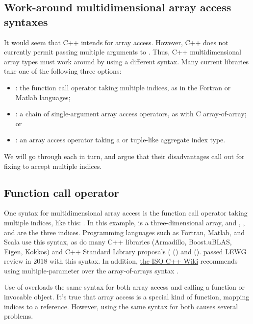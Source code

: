 \documentclass{wg21}
\begin{document}
\subsection{Work-around multidimensional array access syntaxes}

It would seem that C++ intends  for array access.  However, C++ does not currently permit passing multiple arguments to .  Thus, C++ multidimensional array types must work around by using a different syntax.  Many current libraries take one of the following three options:

\begin{itemize}
\item {}: the function call operator taking multiple indices, as in the Fortran or Matlab languages;
\item {}: a chain of single-argument array access operators, as with C array-of-array; or
\item {}: an array access operator taking a  or tuple-like aggregate index type.
\end{itemize}

We will go through each in turn, and argue that their disadvantages call out for fixing  to accept multiple indices.

\subsection{Function call operator}

One syntax for multidimensional array access is the function call operator taking multiple indices, like this: .  In this example,  is a three-dimensional array, and , , and  are the three indices.  Programming languages such as Fortran, Matlab, and Scala use this syntax, as do many C++ libraries (Armadillo, Boost.uBLAS, Eigen, Kokkos) and C++ Standard Library proposals ( () and  ().   passed LEWG review in 2018 with this syntax.  In addition, \href{https://isocpp.org/wiki/faq/operator-overloading#matrix-subscript-op}{the ISO C++ Wiki} recommends using multiple-parameter  over the array-of-arrays syntax .

Use of  overloads the same syntax for both array access and calling a function or invocable object.  It's true that array access is a special kind of function, mapping indices to a reference.  However, using the same syntax for both causes several problems.
\end{document}
